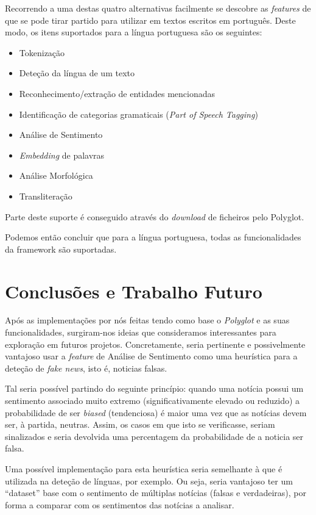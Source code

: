 \documentclass{article}
\begin{document}
Recorrendo a uma destas quatro alternativas facilmente se descobre as \textit{features} de que se pode tirar partido para utilizar em textos escritos em português. Deste modo, os itens suportados para a língua portuguesa são os seguintes:
\begin{itemize}
    \item Tokenização
    \item Deteção da língua de um texto
    \item Reconhecimento/extração de entidades mencionadas
    \item Identificação de categorias gramaticais (\textit{Part of Speech Tagging})
    \item Análise de Sentimento
    \item \textit{Embedding} de palavras
    \item Análise Morfológica
    \item Transliteração
\end{itemize}

Parte deste suporte é conseguido através do \textit{download} de ficheiros pelo Polyglot.

Podemos então concluir que para a língua portuguesa, todas as funcionalidades da framework são suportadas.


\section{Conclusões e Trabalho Futuro}
\qquad Após as implementações por nós feitas tendo como base o \textit{Polyglot} e as suas funcionalidades, surgiram-nos ideias que consideramos interessantes para exploração em futuros projetos. Concretamente, seria pertinente e possivelmente vantajoso usar a \textit{feature} de Análise de Sentimento como uma heurística para a deteção de \textit{fake news}, isto é, noticias falsas. 

Tal seria possível partindo do seguinte princípio: quando uma notícia possui um sentimento associado muito extremo (significativamente elevado ou reduzido) a probabilidade de ser \textit{biased} (tendenciosa) é maior uma vez que as notícias devem ser, à partida, neutras. Assim, os casos em que isto se verificasse, seriam sinalizados e seria devolvida uma percentagem da probabilidade de a noticia ser falsa.

Uma possível implementação para esta heurística seria semelhante à que é utilizada na deteção de línguas, por exemplo. Ou seja, seria vantajoso ter um ``dataset'' base com o sentimento de múltiplas notícias (falsas e verdadeiras), por forma a comparar com os sentimentos das notícias a analisar.
\end{document}
